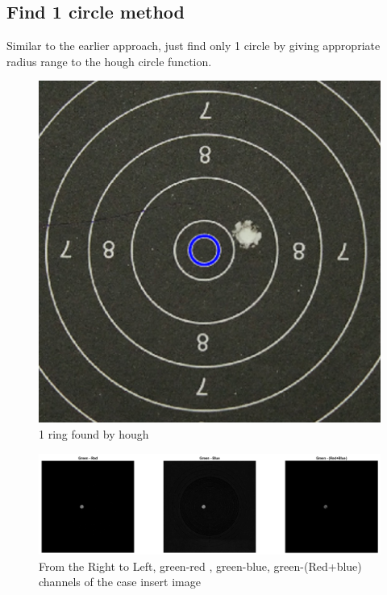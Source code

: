 \documentclass[10pt,twocolumn,letterpaper]{article}
\begin{document}
\subsection{Find 1 circle method}
Similar to the earlier approach, just find only 1 circle by giving appropriate radius range to the hough circle function.
\begin{figure}[h]
	\centering
	\includegraphics[width=\linewidth]{oneRing}
	\caption{1 ring found by hough}
\end{figure}

\begin{figure}[!h]
	\centering
	\includegraphics[width=\textwidth]{BulletPositionExtraction}
	\caption{From the Right to Left, green-red , green-blue, green-(Red+blue) channels of the case insert image}
	\label{BulletPositionExtractionImage}
\end{figure}
\end{document}
